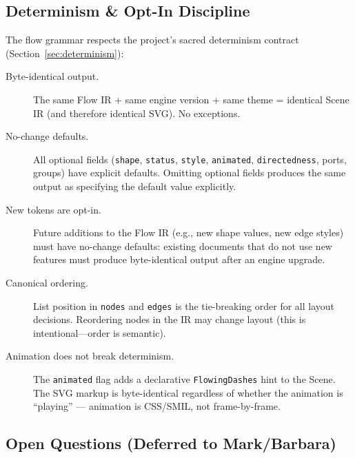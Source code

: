 \subsection{Determinism \& Opt-In Discipline}
\label{sec:flow-determinism}

The flow grammar respects the project's sacred determinism contract (Section~\ref{sec:determinism}):

\begin{description}
  \item[Byte-identical output.] The same Flow IR + same engine version + same theme = identical Scene IR (and therefore identical SVG). No exceptions.
  
  \item[No-change defaults.] All optional fields (\texttt{shape}, \texttt{status}, \texttt{style}, \texttt{animated}, \texttt{directedness}, ports, groups) have explicit defaults. Omitting optional fields produces the same output as specifying the default value explicitly.
  
  \item[New tokens are opt-in.] Future additions to the Flow IR (e.g., new shape values, new edge styles) must have no-change defaults: existing documents that do not use new features must produce byte-identical output after an engine upgrade.
  
  \item[Canonical ordering.] List position in \texttt{nodes} and \texttt{edges} is the tie-breaking order for all layout decisions. Reordering nodes in the IR may change layout (this is intentional---order is semantic).
  
  \item[Animation does not break determinism.] The \texttt{animated} flag adds a declarative \texttt{FlowingDashes} hint to the Scene. The SVG markup is byte-identical regardless of whether the animation is ``playing'' --- animation is CSS/SMIL, not frame-by-frame.
\end{description}

\subsection{Open Questions (Deferred to Mark/Barbara)}
\label{sec:flow-open-questions}

